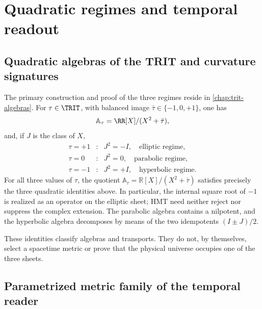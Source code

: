 
\chapter{Quadratic regimes and temporal readout}
\label{chap:regimenes-cuadraticos-tiempo}

\section{Quadratic algebras of the TRIT and curvature signatures}
\label{sec:regimenes-cuadraticos-recibidos}

The primary construction and proof of the three regimes reside in
\cref{chap:trit-algebras}. For
\(\tau\in\TRIT\), with balanced image
\(\bar\tau\in\{-1,0,+1\}\), one has
\[
 \mathbb A_\tau=\RR[X]/(X^2+\bar\tau),
\]
and, if \(J\) is the class of \(X\),
\[
\begin{array}{ccl}
 \tau=+1&:&J^2=-I,\quad\text{elliptic regime},\\
 \tau=0&:&J^2=0,\quad\text{parabolic regime},\\
 \tau=-1&:&J^2=+I,\quad\text{hyperbolic regime}.
\end{array}
\]
For all three values of \(\tau\), the quotient
\(\mathbb A_\tau=\mathbb R[X]/(X^2+\bar\tau)\) satisfies precisely the three
quadratic identities above. In particular, the internal square root of
\(-1\) is realized as an operator on the elliptic sheet; HMT need neither reject nor
suppress the complex extension. The parabolic algebra contains a nilpotent,
and the hyperbolic algebra decomposes by means of the two idempotents
\((I\pm J)/2\).

These identities classify algebras and transports. They do not, by themselves,
select a spacetime metric or prove that the physical universe occupies one
of the three sheets.

\section{Parametrized metric family of the temporal reader}
\label{sec:ansatz-metrico-tres-curvaturas}

